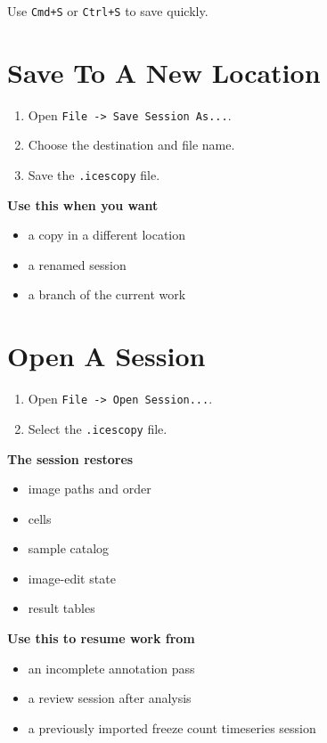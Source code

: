 \documentclass[
  9pt,
  letterpaper,
  oneside,
  open=any,
  DIV=15,
  parskip=half-,
  headings=big,
  numbers=noenddot
]{scrbook}
\newcommand{\manuallead}[1]{%
  \vspace{0.15em}%
  {\sffamily\bfseries\color{ManualBlue}#1}\par\nobreak\vspace{0.05em}%
}
\begin{document}
Use \texttt{Cmd+S} or \texttt{Ctrl+S} to save quickly.


\section{Save To A New Location}

\begin{enumerate}[leftmargin=*,itemsep=0.35em,topsep=0.4em]
\item Open \texttt{File -> Save Session As...}.
\item Choose the destination and file name.
\item Save the \texttt{.icescopy} file.
\end{enumerate}

\manuallead{Use this when you want}

\begin{itemize}[leftmargin=*,itemsep=0.35em,topsep=0.4em]
\item a copy in a different location
\item a renamed session
\item a branch of the current work
\end{itemize}

\section{Open A Session}

\begin{enumerate}[leftmargin=*,itemsep=0.35em,topsep=0.4em]
\item Open \texttt{File -> Open Session...}.
\item Select the \texttt{.icescopy} file.
\end{enumerate}

\manuallead{The session restores}

\begin{itemize}[leftmargin=*,itemsep=0.35em,topsep=0.4em]
\item image paths and order
\item cells
\item sample catalog
\item image-edit state
\item result tables
\end{itemize}

\manuallead{Use this to resume work from}

\begin{itemize}[leftmargin=*,itemsep=0.35em,topsep=0.4em]
\item an incomplete annotation pass
\item a review session after analysis
\item a previously imported freeze count timeseries session
\end{itemize}
\end{document}
